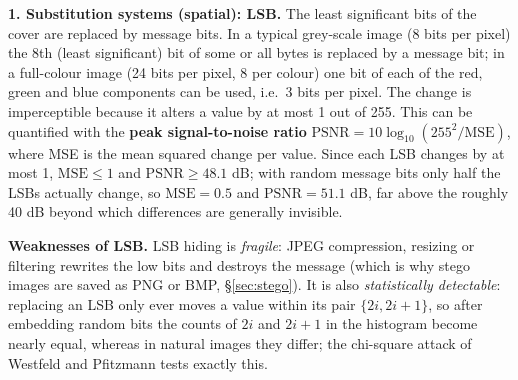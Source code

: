 \textbf{1. Substitution systems (spatial): LSB.} The least significant bits of the cover are replaced by message bits. In a typical grey-scale image (8 bits per pixel) the 8th (least significant) bit of some or all bytes is replaced by a message bit; in a full-colour image (24 bits per pixel, 8 per colour) one bit of each of the red, green and blue components can be used, i.e.\ 3 bits per pixel. The change is imperceptible because it alters a value by at most 1 out of 255. This can be quantified with the \textbf{peak signal-to-noise ratio} $\mathrm{PSNR} = 10\log_{10}(255^2/\mathrm{MSE})$, where MSE is the mean squared change per value. Since each LSB changes by at most 1, $\mathrm{MSE} \le 1$ and $\mathrm{PSNR} \ge 48.1$ dB; with random message bits only half the LSBs actually change, so $\mathrm{MSE} = 0.5$ and $\mathrm{PSNR} = 51.1$ dB, far above the roughly 40 dB beyond which differences are generally invisible.

\textbf{Weaknesses of LSB.} LSB hiding is \emph{fragile}: JPEG compression, resizing or filtering rewrites the low bits and destroys the message (which is why stego images are saved as PNG or BMP, \S\ref{sec:stego}). It is also \emph{statistically detectable}: replacing an LSB only ever moves a value within its pair $\{2i, 2i+1\}$, so after embedding random bits the counts of $2i$ and $2i+1$ in the histogram become nearly equal, whereas in natural images they differ; the chi-square attack of Westfeld and Pfitzmann tests exactly this.

